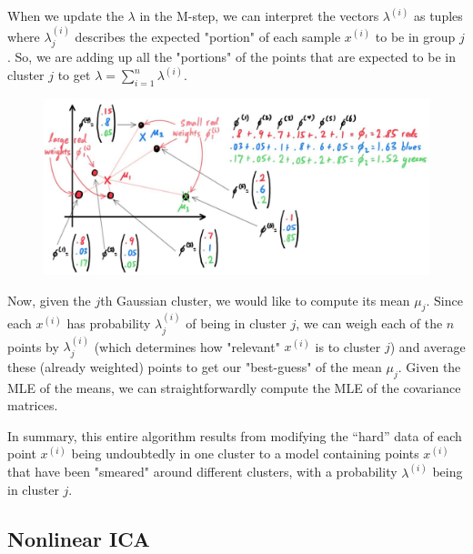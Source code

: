 \documentclass{article}
\begin{document}
  When we update the $\lambda$ in the M-step, we can interpret the vectors $\lambda^{(i)}$ as tuples where $\lambda^{(i)}_j$ describes the expected "portion" of each sample $x^{(i)}$ to be in group $j$. So, we are adding up all the "portions" of the points that are expected to be in cluster $j$ to get $\lambda= \sum_{i=1}^n \lambda^{(i)}$. 

  \begin{figure}[H]
    \centering 
    \includegraphics[scale=0.2]{img/weighted_means.jpg}
    \caption{}
    \label{fig:weighted_means}
  \end{figure}

  Now, given the $j$th Gaussian cluster, we would like to compute its mean $\mu_j$. Since each $x^{(i)}$ has probability $\lambda^{(i)}_j$ of being in cluster $j$, we can weigh each of the $n$ points by $\lambda^{(i)}_j$ (which determines how "relevant" $x^{(i)}$ is to cluster $j$) and average these (already weighted) points to get our "best-guess" of the mean $\mu_j$. Given the MLE of the means, we can straightforwardly compute the MLE of the covariance matrices. 

  In summary, this entire algorithm results from modifying the ``hard'' data of each point $x^{(i)}$ being undoubtedly in one cluster to a model containing points $x^{(i)}$ that have been "smeared" around different clusters, with a probability $\lambda^{(i)}$ being in cluster $j$. 

\subsection{Nonlinear ICA} 



\end{document}
